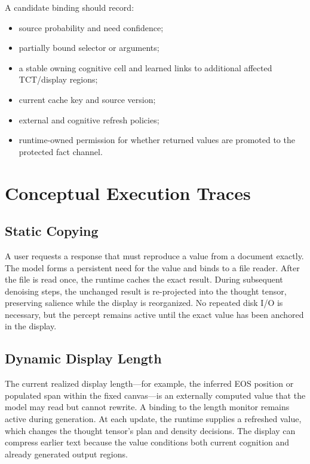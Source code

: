 A candidate binding should record:
\begin{itemize}[leftmargin=*]
  \item source probability and need confidence;
  \item partially bound selector or arguments;
  \item a stable owning cognitive cell and learned links to additional affected TCT/display regions;
  \item current cache key and source version;
  \item external and cognitive refresh policies;
  \item runtime-owned permission for whether returned values are promoted to the protected fact channel.
\end{itemize}

\section{Conceptual Execution Traces}
\label{app:traces}

\subsection{Static Copying}

A user requests a response that must reproduce a value from a document exactly. The model forms a persistent need for the value and binds to a file reader. After the file is read once, the runtime caches the exact result. During subsequent denoising steps, the unchanged result is re-projected into the thought tensor, preserving salience while the display is reorganized. No repeated disk I/O is necessary, but the percept remains active until the exact value has been anchored in the display.

\subsection{Dynamic Display Length}

The current realized display length---for example, the inferred EOS position or populated span within the fixed canvas---is an externally computed value that the model may read but cannot rewrite. A binding to the length monitor remains active during generation. At each update, the runtime supplies a refreshed value, which changes the thought tensor's plan and density decisions. The display can compress earlier text because the value conditions both current cognition and already generated output regions.


